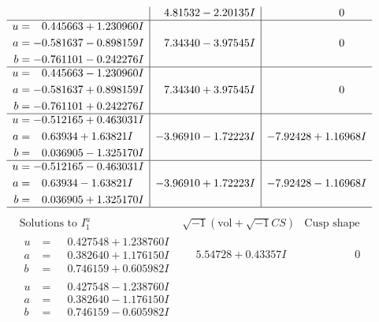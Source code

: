 \documentclass[1p]{elsarticle_modified}
\theoremstyle{definition}
\newcommand{\I}{\sqrt{-1}}
\begin{document}
$$\begin{array}{c|c|c}
 & \phantom{-}4.81532 - 2.20135 I & \phantom{-0.000000 } 0 \\ \hline\begin{aligned}
u &= \phantom{-}0.445663 + 1.230960 I \\
a &= -0.581637 - 0.898159 I \\
b &= -0.761101 - 0.242276 I\end{aligned}
 & \phantom{-}7.34340 - 3.97545 I & \phantom{-0.000000 } 0 \\ \hline\begin{aligned}
u &= \phantom{-}0.445663 - 1.230960 I \\
a &= -0.581637 + 0.898159 I \\
b &= -0.761101 + 0.242276 I\end{aligned}
 & \phantom{-}7.34340 + 3.97545 I & \phantom{-0.000000 } 0 \\ \hline\begin{aligned}
u &= -0.512165 + 0.463031 I \\
a &= \phantom{-}0.63934 + 1.63821 I \\
b &= \phantom{-}0.036905 - 1.325170 I\end{aligned}
 & -3.96910 - 1.72223 I & -7.92428 + 1.16968 I \\ \hline\begin{aligned}
u &= -0.512165 - 0.463031 I \\
a &= \phantom{-}0.63934 - 1.63821 I \\
b &= \phantom{-}0.036905 + 1.325170 I\end{aligned}
 & -3.96910 + 1.72223 I & -7.92428 - 1.16968 I\\
 \hline 
 \end{array}$$\newpage$$\begin{array}{c|c|c}  
\text{Solutions to }I^u_{1}& \I (\text{vol} + \sqrt{-1}CS) & \text{Cusp shape}\\
 \hline 
\begin{aligned}
u &= \phantom{-}0.427548 + 1.238760 I \\
a &= \phantom{-}0.382640 + 1.176150 I \\
b &= \phantom{-}0.746159 + 0.605982 I\end{aligned}
 & \phantom{-}5.54728 + 0.43357 I & \phantom{-0.000000 } 0 \\ \hline\begin{aligned}
u &= \phantom{-}0.427548 - 1.238760 I \\
a &= \phantom{-}0.382640 - 1.176150 I \\
b &= \phantom{-}0.746159 - 0.605982 I\end{aligned}

\end{array}$$
\end{document}
